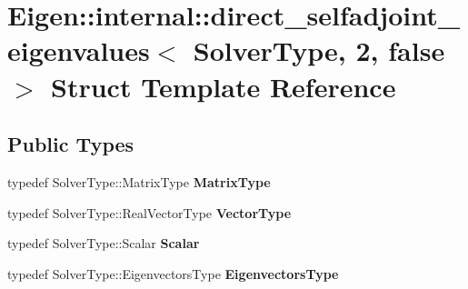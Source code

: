 \hypertarget{struct_eigen_1_1internal_1_1direct__selfadjoint__eigenvalues_3_01_solver_type_00_012_00_01false_01_4}{}\section{Eigen\+::internal\+::direct\+\_\+selfadjoint\+\_\+eigenvalues$<$ Solver\+Type, 2, false $>$ Struct Template Reference}
\label{struct_eigen_1_1internal_1_1direct__selfadjoint__eigenvalues_3_01_solver_type_00_012_00_01false_01_4}
\subsection*{Public Types}
\begin{DoxyCompactItemize}
\item 
\mbox{\label{struct_eigen_1_1internal_1_1direct__selfadjoint__eigenvalues_3_01_solver_type_00_012_00_01false_01_4_ad4737401b97adbb299ab4e64d5a13b79}} 
typedef Solver\+Type\+::\+Matrix\+Type {\bfseries Matrix\+Type}
\item 
\mbox{\label{struct_eigen_1_1internal_1_1direct__selfadjoint__eigenvalues_3_01_solver_type_00_012_00_01false_01_4_a9a515dab7880b222aff4847641c40ed2}} 
typedef Solver\+Type\+::\+Real\+Vector\+Type {\bfseries Vector\+Type}
\item 
\mbox{\label{struct_eigen_1_1internal_1_1direct__selfadjoint__eigenvalues_3_01_solver_type_00_012_00_01false_01_4_a8494659a9d6ef5917f2b9063808b9214}} 
typedef Solver\+Type\+::\+Scalar {\bfseries Scalar}
\item 
\mbox{\label{struct_eigen_1_1internal_1_1direct__selfadjoint__eigenvalues_3_01_solver_type_00_012_00_01false_01_4_ab88affec1ba41f7662e263fa86102255}} 
typedef Solver\+Type\+::\+Eigenvectors\+Type {\bfseries Eigenvectors\+Type}
\end{DoxyCompactItemize}
